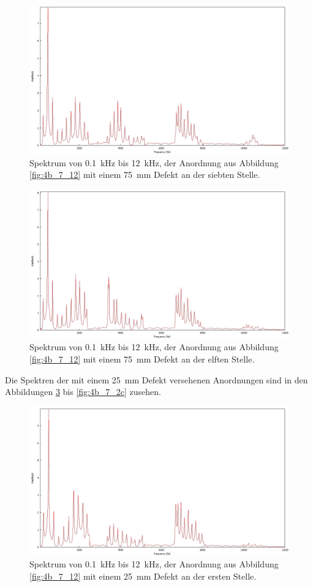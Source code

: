 \begin{figure}
\centering
\includegraphics[width=\textwidth]{content/messungen/Chapter4b/4b_7_1b.jpg}
\caption{Spektrum von 0.1~kHz bis 12~kHz, der Anordnung aus Abbildung \ref{fig:4b_7_12} mit einem 75~mm Defekt an der siebten Stelle.}
\label{fig:4b_7_1b}
\end{figure}
\begin{figure}
\centering
\includegraphics[width=\textwidth]{content/messungen/Chapter4b/4b_7_1c.jpg}
\caption{Spektrum von 0.1~kHz bis 12~kHz, der Anordnung aus Abbildung \ref{fig:4b_7_12} mit einem 75~mm Defekt an der elften Stelle.}
\label{fig:4b_7_1c}
\end{figure}
Die Spektren der mit einem 25~mm Defekt versehenen Anordnungen sind in den Abbildungen \ref{fig:4b_7_2a} bis \ref{fig:4b_7_2c} zusehen.
\begin{figure}
\centering
\includegraphics[width=\textwidth]{content/messungen/Chapter4b/4b_7_2a.jpg}
\caption{Spektrum von 0.1~kHz bis 12~kHz, der Anordnung aus Abbildung \ref{fig:4b_7_12} mit einem 25~mm Defekt an der ersten Stelle.}
\label{fig:4b_7_2a}
\end{figure}

